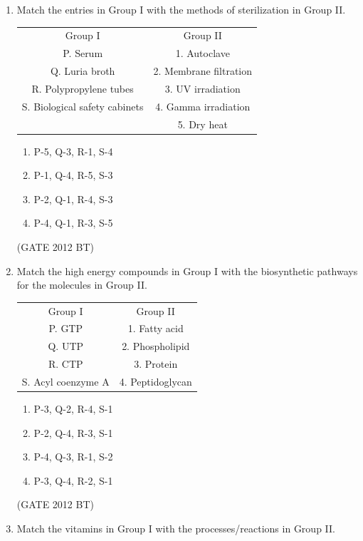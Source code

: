 \documentclass[journal,12pt,onecolumn]{IEEEtran}
\theoremstyle{remark}
\begin{document}
\begin{enumerate}
\item Match the entries in Group I with the methods of sterilization in Group II.\\
\begin{tabular}{c c}
    Group I&	Group II\\
P.	Serum	&1.	Autoclave\\
Q.	Luria broth	&2.	Membrane filtration\\
R.	Polypropylene tubes&	3.	UV irradiation\\
S.	Biological safety cabinets&	4.	Gamma irradiation\\
&5.	Dry heat
\end{tabular}
\begin{multicols}{4}
\begin{enumerate}
\item P-5, Q-3, R-1, S-4	
\item  P-1, Q-4, R-5, S-3
\item  P-2, Q-1, R-4, S-3	
\item  P-4, Q-1, R-3, S-5
\end{enumerate}
\end{multicols} \hfill(GATE 2012 BT)


\item Match the high energy compounds in Group I with the biosynthetic pathways for the molecules in
Group II.\\
\begin{tabular}{c c}

Group I&	Group II\\
P.	GTP	&1.	Fatty acid\\
Q.	UTP	&2.	Phospholipid\\
R.	CTP	&3.	Protein\\
S.	Acyl coenzyme A	&4.	Peptidoglycan\end{tabular}
\begin{multicols}{4}
\begin{enumerate}
\item P-3, Q-2, R-4, S-1	
\item  P-2, Q-4, R-3, S-1
\item P-4, Q-3, R-1, S-2	
\item  P-3, Q-4, R-2, S-1
\end{enumerate}
\end{multicols} \hfill(GATE 2012 BT)


\item Match the vitamins in Group I with the processes/reactions in Group II.\\
\begin{tabular}{c c}


\end{tabular}
\end{enumerate}
\end{document}
